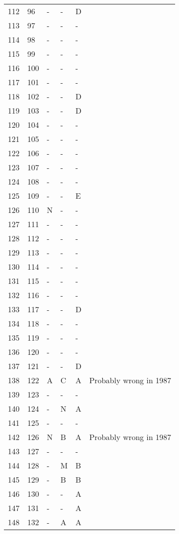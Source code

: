 \documentclass[10pt]{article}
\begin{document}
\begin{longtable}{llllll}
  112 & 96 & - & - & D &  \\ 
  113 & 97 & - & - & - &  \\ 
  114 & 98 & - & - & - &  \\ 
  115 & 99 & - & - & - &  \\ 
  116 & 100 & - & - & - &  \\ 
  117 & 101 & - & - & - &  \\ 
  118 & 102 & - & - & D &  \\ 
  119 & 103 & - & - & D &  \\ 
  120 & 104 & - & - & - &  \\ 
  121 & 105 & - & - & - &  \\ 
  122 & 106 & - & - & - &  \\ 
  123 & 107 & - & - & - &  \\ 
  124 & 108 & - & - & - &  \\ 
  125 & 109 & - & - & E &  \\ 
  126 & 110 & N & - & - &  \\ 
  127 & 111 & - & - & - &  \\ 
  128 & 112 & - & - & - &  \\ 
  129 & 113 & - & - & - &  \\ 
  130 & 114 & - & - & - &  \\ 
  131 & 115 & - & - & - &  \\ 
  132 & 116 & - & - & - &  \\ 
  133 & 117 & - & - & D &  \\ 
  134 & 118 & - & - & - &  \\ 
  135 & 119 & - & - & - &  \\ 
  136 & 120 & - & - & - &  \\ 
  137 & 121 & - & - & D &  \\ 
  138 & 122 & A & C & A & Probably wrong in 1987 \\ 
  139 & 123 & - & - & - &  \\ 
  140 & 124 & - & N & A &  \\ 
  141 & 125 & - & - & - &  \\ 
  142 & 126 & N & B & A & Probably wrong in 1987 \\ 
  143 & 127 & - & - & - &  \\ 
  144 & 128 & - & M & B &  \\ 
  145 & 129 & - & B & B &  \\ 
  146 & 130 & - & - & A &  \\ 
  147 & 131 & - & - & A &  \\ 
  148 & 132 & - & A & A &  \\ 

\end{longtable}
\end{document}
